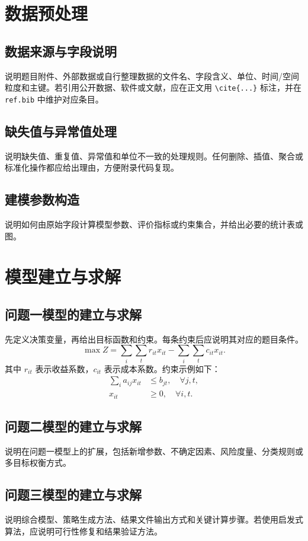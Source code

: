 \documentclass[UTF8,a4paper,zihao=-4]{ctexart}
\begin{document}
\section{数据预处理}
\subsection{数据来源与字段说明}
说明题目附件、外部数据或自行整理数据的文件名、字段含义、单位、时间/空间粒度和主键。若引用公开数据、软件或文献，应在正文用 \verb|\cite{...}| 标注，并在 \texttt{ref.bib} 中维护对应条目。

\subsection{缺失值与异常值处理}
说明缺失值、重复值、异常值和单位不一致的处理规则。任何删除、插值、聚合或标准化操作都应给出理由，方便附录代码复现。

\subsection{建模参数构造}
说明如何由原始字段计算模型参数、评价指标或约束集合，并给出必要的统计表或图。

\section{模型建立与求解}
\subsection{问题一模型的建立与求解}
先定义决策变量，再给出目标函数和约束。每条约束后应说明其对应的题目条件。
\begin{equation}
  \max Z = \sum_{i}\sum_t r_{it}x_{it} - \sum_i\sum_t c_{it}x_{it}.
\end{equation}
其中 $r_{it}$ 表示收益系数，$c_{it}$ 表示成本系数。约束示例如下：
\begin{align}
  \sum_i a_{ij}x_{it} &\le b_{jt}, \quad \forall j,t,\\
  x_{it} &\ge 0, \quad \forall i,t.
\end{align}

\subsection{问题二模型的建立与求解}
说明在问题一模型上的扩展，包括新增参数、不确定因素、风险度量、分类规则或多目标权衡方式。

\subsection{问题三模型的建立与求解}
说明综合模型、策略生成方法、结果文件输出方式和关键计算步骤。若使用启发式算法，应说明可行性修复和结果验证方法。
\end{document}
